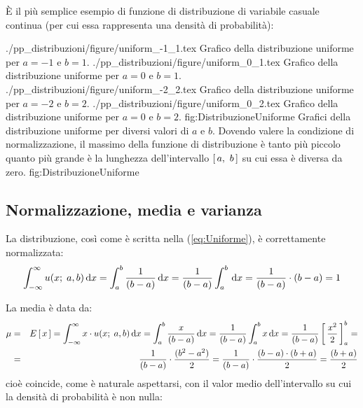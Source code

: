 \label{DistribuzioneUniforme}
\`E il pi\`u semplice esempio di funzione di distribuzione di variabile
casuale continua (per cui essa rappresenta una densit\`a di probabilit\`a):

\panelfig
{\twobytwotexfig
{./pp_distribuzioni/figure/uniform_-1_1.tex}
{Grafico della distribuzione uniforme per $a=-1$ e $b=1$.}
{./pp_distribuzioni/figure/uniform_0_1.tex}
{Grafico della distribuzione uniforme per $a=0$ e $b=1$.}
{./pp_distribuzioni/figure/uniform_-2_2.tex}
{Grafico della distribuzione uniforme per $a=-2$ e $b=2$.}
{./pp_distribuzioni/figure/uniform_0_2.tex}
{Grafico della distribuzione uniforme per $a=0$ e $b=2$.}
{fig:DistribuzioneUniforme}}
{Grafici della distribuzione uniforme per diversi valori di $a$ e $b$.
Dovendo valere la condizione di normalizzazione, il massimo della 
funzione di distribuzione \`e tanto pi\`u piccolo quanto pi\`u
grande \`e la lunghezza dell'intervallo $\cinterval{a}{b}$ su cui essa \`e
diversa da zero.}
{fig:DistribuzioneUniforme}


\subsection{Normalizzazione, media e varianza}

La distribuzione, cos\`i come \`e scritta nella (\ref{eq:Uniforme}),
\`e correttamente normalizzata:
$$
\dintegral{\uniformpdf{x}{a, b}}{x}{-\infty}{\infty} =
\dintegral{\frac{1}{(b-a)}}{x}{a}{b} =
\frac{1}{(b-a)}\dintegral{}{x}{a}{b} =
\frac{1}{(b-a)} \cdot (b-a) = 1
$$

La media  \`e data da:
\begin{eqnarray*}
\mu & = & \expect{x} =
\dintegral{x \cdot \uniformpdf{x}{a, b}}{x}{-\infty}{\infty} =
\dintegral{\frac{x}{(b-a)}}{x}{a}{b} =
\frac{1}{(b-a)} \dintegral{x}{x}{a}{b} =
\frac{1}{(b-a)}\eval{\frac{x^2}{2}}{a}{b} =\\
& = & \frac{1}{(b-a)}\cdot \frac{(b^2-a^2)}{2} =
\frac{1}{(b-a)}\cdot \frac{(b-a)\cdot(b+a)}{2} =
\frac{(b+a)}{2}
\end{eqnarray*}
cio\`e coincide, come \`e naturale aspettarsi, con il valor
medio dell'intervallo su cui la densit\`a di probabilit\`a \`e non
nulla:

